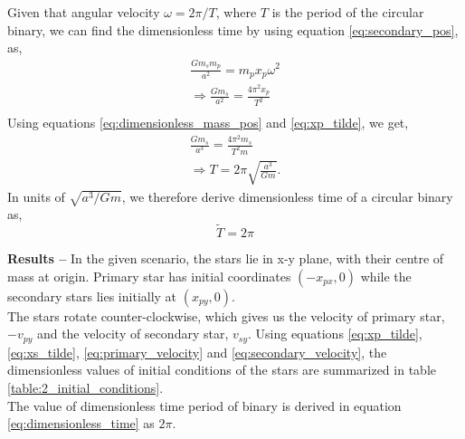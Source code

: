 \documentclass[a4paper]{article}
\begin{document}
\begin{enumerate} [label*=\textbf{(\alph*)}]
				Given that angular velocity \(\omega = 2\pi / T\), where \(T\) is the period of the circular binary, we can find the dimensionless time by using equation \ref{eq:secondary_pos}, as,
				\begin{equation}
					\begin{gathered}
						\nonumber \frac{G m_s m_p}{a^2} = m_p x_p \omega^2 \\
						\Rightarrow \frac{G m_s}{a^2} = \frac{4 \pi^2 x_p}{T^2} \\
					\end{gathered}
				\end{equation}
				Using equations \ref{eq:dimensionless_mass_pos} and \ref{eq:xp_tilde}, we get,
				\begin{equation}
					\begin{gathered}
						\frac{G m_s}{a^3} = \frac{4 \pi^2 m_s}{T^2 m} \\
						\Rightarrow T = 2 \pi \sqrt{\frac{a^3}{Gm}}.
					\end{gathered}
				\end{equation}
				In units of \(\sqrt{a^3/Gm}\), we therefore derive dimensionless time of a circular binary as,
				\begin{equation}
					\tilde{T} = 2 \pi
					\label{eq:dimensionless_time}
				\end{equation}
				
				\subitem \textbf{Results  --}
				In the given scenario, the stars lie in x-y plane, with their centre of mass at origin. Primary star has initial coordinates \((-x_{px},0)\) while the secondary stars lies initially at \((x_{py},0)\).\\
				The stars rotate counter-clockwise, which gives us the velocity of primary star, \(-v_{py}\) and the velocity of secondary star, \(v_{sy}\).
				Using equations \ref{eq:xp_tilde}, \ref{eq:xs_tilde}, \ref{eq:primary_velocity} and \ref{eq:secondary_velocity}, the dimensionless values of initial conditions of the stars are summarized in table \ref{table:2_initial_conditions}.\\ The value of dimensionless time period of binary is derived in equation \ref{eq:dimensionless_time} as \(2 \pi\).
				

\end{enumerate}
\end{document}
